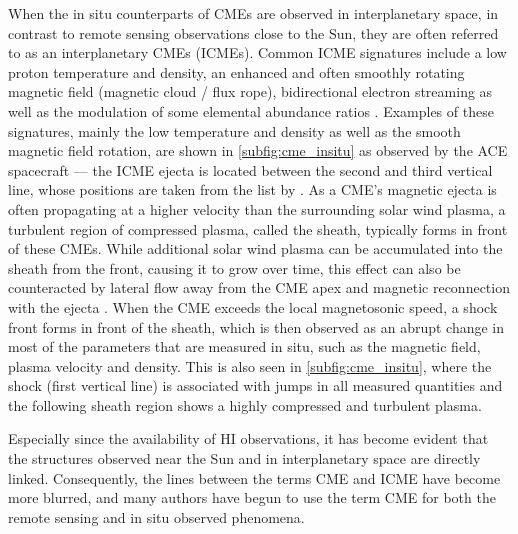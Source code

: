When the in situ counterparts of \acp{CME} are observed in interplanetary space, in contrast to remote sensing observations close to the Sun, they are often referred to as an interplanetary \acp{CME} (\acsp{ICME}). Common \ac{ICME} signatures include a low proton temperature and density, an enhanced and often smoothly rotating magnetic field (magnetic cloud / flux rope), bidirectional electron streaming as well as the modulation of some elemental abundance ratios \citep{Richardson-Cane-1995,Zurbuchen-2006-insitu-signatures,Wimmer-Schweingruber2006}. Examples of these signatures, mainly the low temperature and density as well as the smooth magnetic field rotation, are shown in \autoref{subfig:cme_insitu} as observed by the \ac{ACE} spacecraft --- the \ac{ICME} ejecta is located between the second and third vertical line, whose positions are taken from the list by \citet{Richardson-Cane-2010}.
As a \ac{CME}'s magnetic ejecta is often propagating at a higher velocity than the surrounding solar wind plasma, a turbulent region of compressed plasma, called the sheath, typically forms in front of these \acp{CME}. While additional solar wind plasma can be accumulated into the sheath from the front, causing it to grow over time, this effect can also be counteracted by lateral flow away from the CME apex and magnetic reconnection with the ejecta \citep[see e.g.][]{Siscoe2008,Manchester2005,Janvier-2019}. When the \ac{CME} exceeds the local magnetosonic speed, a shock front forms in front of the sheath, which is then observed as an abrupt change in most of the parameters that are measured in situ, such as the magnetic field, plasma velocity and density. This is also seen in \autoref{subfig:cme_insitu}, where the shock (first vertical line) is associated with jumps in all measured quantities and the following sheath region shows a highly compressed and turbulent plasma.

Especially since the availability of \ac{HI} observations, it has become evident that the structures observed near the Sun and in interplanetary space are directly linked. Consequently, the lines between the terms \ac{CME} and \ac{ICME} have become more blurred, and many authors have begun to use the term \ac{CME} for both the remote sensing and in situ observed phenomena.

